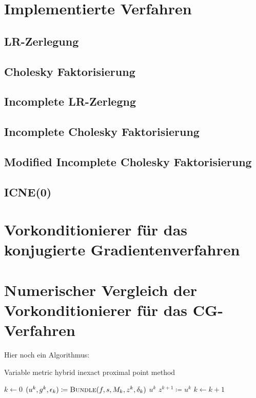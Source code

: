 \newpage

\section{Implementierte Verfahren}



\subsection{LR-Zerlegung}
\subsection{Cholesky Faktorisierung}
\subsection{Incomplete LR-Zerlegng}
\subsection{Incomplete Cholesky Faktorisierung}
\subsection{Modified Incomplete Cholesky Faktorisierung}
\subsection{ICNE(0)}


\section{Vorkonditionierer f\"ur das konjugierte Gradientenverfahren}

\section{Numerischer Vergleich der Vorkonditionierer f\"ur das CG-Verfahren}






Hier noch ein Algorithmus:

\begin{algorithm}[ht]
\caption{Variable metric hybrid inexact proximal point
method}\label{SG_alg:vmhippm}
\begin{algorithmic}[1]
 \State $k \gets 0$
   \State $(u^k, g^k, \epsilon_k) \coloneqq \Call{Bundle}{f, s, M_k,
z^k, \delta_k}$ 
\State \Return $u^k$  \EndIf
   \State $z^{k+1} \coloneqq u^k$ 
   \State $k \gets k + 1$
 \EndWhile
\EndFunction
\end{algorithmic}
\end{algorithm}

